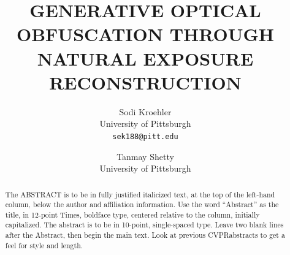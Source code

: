 \documentclass[10pt,twocolumn,letterpaper]{article}
\title{GENERATIVE OPTICAL OBFUSCATION THROUGH NATURAL EXPOSURE RECONSTRUCTION}
\author{Sodi Kroehler\\
University of Pittsburgh\\
{\tt\small sek188@pitt.edu}
\and
Tanmay Shetty\\
University of Pittsburgh\\
}
\def\confName{CVPR}
\begin{document}
\maketitle


\begin{abstract}
The ABSTRACT is to be in fully justified italicized text, at the top of the left-hand column, below the author and affiliation information.
Use the word ``Abstract'' as the title, in 12-point Times, boldface type, centered relative to the column, initially capitalized.
The abstract is to be in 10-point, single-spaced type.
Leave two blank lines after the Abstract, then begin the main text.
Look at previous \confName abstracts to get a feel for style and length.
\end{abstract}








{
    \small
    
    
}

% 
\end{document}
